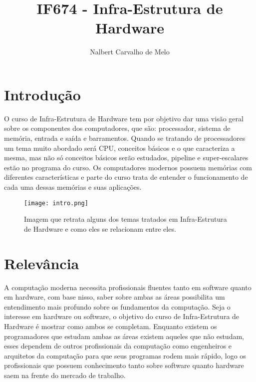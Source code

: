 \documentclass{article}
\begin{document}
\title{IF674 - Infra-Estrutura de Hardware}
\maketitle
\author{Nalbert Carvalho de Melo}
\section{Introdução}
O curso de Infra-Estrutura de Hardware tem por objetivo dar uma visão geral sobre os componentes dos computadores, que são:  processador, sistema de memória, entrada e saída e barramentos. Quando se tratando de processadores um tema muito abordado será CPU, conceitos básicos e o que caracteriza a mesma, mas não só conceitos básicos serão estudados, pipeline e super-escalares estão no programa do curso. Os computadores modernos possuem memórias com diferentes características e parte do curso trata de entender o funcionamento de cada uma dessas memórias e suas aplicações\citep{ref1}. 
\begin{figure}[h!]
    \centering
    \texttt{[image: intro.png]}
    \caption{Imagem que retrata alguns dos temas tratados em Infra-Estrutura de Hardware e como eles se relacionam entre eles.}
    \citep{ref1}
    
    \label{fig:imagem}
\end{figure}


\section{Relevância}
A computação moderna necessita profissionais fluentes tanto em software quanto em hardware, com base nisso, saber sobre ambas as áreas possibilita um entendimento mais profundo sobre os fundamentos da computação. Seja o interesse em hardware ou software, o objetivo do curso de Infra-Estrutura de Hardware é mostrar como ambos se completam. Enquanto existem os programadores que estudam ambas as áreas existem aqueles que não estudam, esses dependem de outros profissionais da computação como engenheiros e arquitetos da computação para que seus programas rodem mais rápido, logo os profissionais que possuem conhecimento tanto sobre software quanto hardware saem na frente do mercado de trabalho\citep{ref2}.
\end{document}
